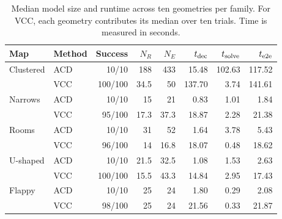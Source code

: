 \begin{table}[htbp]
\caption{Median model size and runtime across ten geometries per family. For VCC, each geometry contributes its median over ten trials. Time is measured in seconds.}
\label{tab:exp-runtime}
\centering
\scriptsize
\setlength{\tabcolsep}{3.0pt}
\begin{tabular}{@{}llrrrrrr@{}}
\toprule
Map & Method & Success & $N_R$ & $N_E$ & $t_{\rm dec}$ & $t_{\rm solve}$ & $t_{\rm e2e}$ \\
\midrule
Clustered & ACD & 10/10 & 188  & 433  & 15.48  & 102.63 & 117.52 \\
          & VCC & 100/100 & 34.5 & 50   & 137.70 & 3.74   & 141.61 \\
Narrows   & ACD & 10/10 & 15   & 21   & 0.83   & 1.01   & 1.84 \\
          & VCC & 95/100 & 17.3 & 37.3 & 18.87  & 2.28   & 21.38 \\
Rooms     & ACD & 10/10 & 31   & 52   & 1.64   & 3.78   & 5.43 \\
          & VCC & 96/100 & 14   & 16.8 & 18.07  & 0.48   & 18.62 \\
U-shaped  & ACD & 10/10 & 21.5 & 32.5 & 1.08   & 1.53   & 2.63 \\
          & VCC & 100/100 & 15.5 & 43.3 & 14.84  & 2.95   & 17.43 \\
Flappy    & ACD & 10/10 & 25   & 24   & 1.80   & 0.29   & 2.08 \\
          & VCC & 98/100 & 25   & 24   & 21.56  & 0.33   & 21.87 \\
\bottomrule
\end{tabular}
\end{table}

